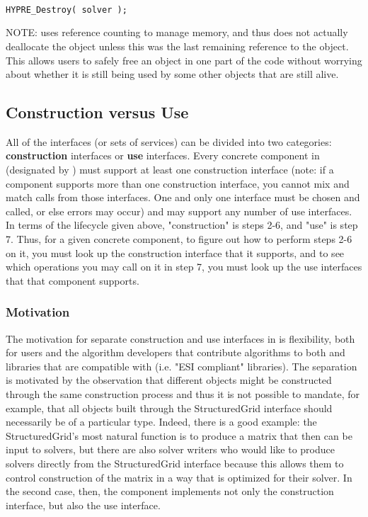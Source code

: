 \begin{enumerate}
\begin{display}
\begin{verbatim}

HYPRE_Destroy( solver );

\end{verbatim}
\end{display}

NOTE: \hypre{} uses reference counting to
manage memory, and 
thus  does not actually deallocate the object unless this was the
last remaining reference 
to the object. This allows users to safely free an object in one part of the
code without worrying about 
whether it is still being used by some other objects that are still alive.

\end{enumerate}

\subsection{Construction versus Use}

All of the \hypre{} interfaces (or sets of services) can be divided into two
categories: {\bf construction} 
interfaces or {\bf use} interfaces. Every concrete component in \hypre{} 
(designated by
) must support at 
least one construction interface (note: if a component supports more than one
construction interface, you 
cannot mix and match calls from those interfaces. One and only one interface
must be chosen and called, or 
else errors may occur) and may support any number of use interfaces. In terms
of the lifecycle given above, 
"construction" is steps 2-6, and "use" is step 7. Thus, for a given concrete
component, to figure out how to 
perform steps 2-6 on it, you must look up the \hypre{} construction interface that
it supports, and to see 
which operations you may call on it in step 7, you must look up the use
interfaces that that component 
supports.

\subsubsection{Motivation} The motivation for separate construction and use interfaces in
\hypre{} is flexibility, both for 
users and the algorithm developers that contribute algorithms to both \hypre{} and
libraries that are 
compatible with \hypre{} (i.e. "ESI compliant" libraries). The separation is
motivated by the observation 
that different objects might be constructed through the same construction
process and thus it is not possible 
to mandate, for example, that all objects built through the StructuredGrid
interface should necessarily be of 
a particular type. Indeed, there is a good example: the StructuredGrid's most
natural function is to produce 
a matrix that then can be input to solvers, but there are also solver writers
who would like to produce 
solvers directly from the StructuredGrid interface because this allows them to
control construction of the 
matrix in a way that is optimized for their solver. In the second case, then,
the component implements not only the 
 construction interface, but also the  use interface.

